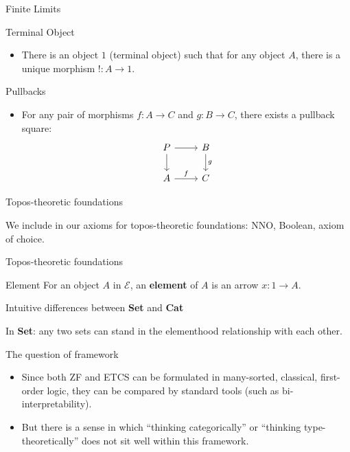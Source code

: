 \documentclass[ignorenonframetext,fleqn]{beamer}
\newcommand{\2}{\mathcal}
\begin{document}
\begin{frame}{Finite Limits}
    \begin{block}{Terminal Object}
        \begin{itemize}
            \item There is an object \( 1 \) (terminal object) such that for any object \( A \), there is a unique morphism \( !: A \to 1 \).
        \end{itemize}
    \end{block}
    \begin{block}{Pullbacks}
        \begin{itemize}
            \item For any pair of morphisms \( f: A \to C \) and \( g: B \to C \), there exists a pullback square:
   \[
            \begin{tikzcd}[ampersand replacement = \&]
            P \arrow[r] \arrow[d] \& B \arrow[d, "g"] \\
            A \arrow[r, "f"] \& C
            \end{tikzcd}
            \]
        \end{itemize}
    \end{block}
  \end{frame}

\begin{frame}{Topos-theoretic foundations}

  We include in our axioms for topos-theoretic foundations: NNO,
  Boolean, axiom of choice.



\end{frame}
    

\begin{frame}{Topos-theoretic foundations}

\begin{block}{Element}
For an object $A$ in $\2E$, an \textbf{element} of $A$ is an arrow
$x:1\to A$.
\end{block}

    
\end{frame}

\begin{frame}{Intuitive differences between \textbf{Set} and
      \textbf{Cat}}

  In \textbf{Set}: any two sets can stand in the elementhood
  relationship with each other.


\end{frame}


\begin{frame}{The question of framework}

  \begin{itemize}
  \item Since both ZF and ETCS can be formulated in many-sorted,
    classical, first-order logic, they can be compared by standard
    tools (such as bi-interpretability). 
  \item But there is a sense in which ``thinking categorically'' or
    ``thinking type-theoretically'' does not sit well within this
    framework.
  \end{itemize}


\end{frame}  
\end{document}

